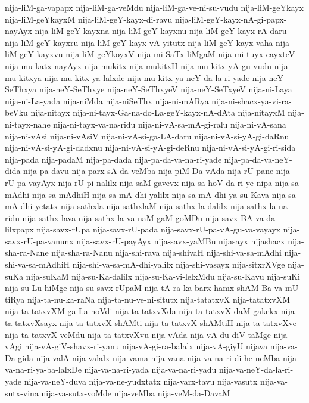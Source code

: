{nija-liM-ga-vapapx
nija-liM-ga-veMdu
nija-liM-ga-ve-ni-su-vudu
nija-liM-geYkayx
nija-liM-geYkayxM
nija-liM-geY-kayx-di-ravu
nija-liM-geY-kayx-nA-gi-papx-nayAyx
nija-liM-geY-kayxna
nija-liM-geY-kayxnu
nija-liM-geY-kayx-rA-daru
nija-liM-geY-kayxru
nija-liM-geY-kayx-vA-yitutx
nija-liM-geY-kayx-vaha
nija-liM-geY-kayxvu
nija-liM-geYkoyxV
nija-mi-SaTx-liMgaM
nija-mi-tuyx-cayxteV
nija-mu-katx-nayAyx
nija-mukitx
nija-mukitxH
nija-mu-kitx-yA-gu-vudu
nija-mu-kitxya
nija-mu-kitx-ya-lalxde
nija-mu-kitx-ya-neY-da-la-ri-yade
nija-neY-SeThxya
nija-neY-SeThxye
nija-neY-SeThxyeV
nija-neY-SeTxyeV
nija-ni-Laya
nija-ni-La-yada
nija-niMda
nija-niSeThx
nija-ni-mARya
nija-ni-shacx-ya-vi-ra-beVku
nija-nitayx
nija-ni-tayx-Ga-na-do-La-geY-kayx-nA-dAta
nija-nitayxM
nija-ni-tayx-nahe
nija-ni-tayx-va-na-ridu
nija-ni-vA-sa-mA-gi-ralu
nija-ni-vA-sana
nija-ni-vAsi
nija-ni-vAsiV
nija-ni-vA-si-ga-LA-daru
nija-ni-vA-si-yA-gi-daRnu
nija-ni-vA-si-yA-gi-dadxnu
nija-ni-vA-si-yA-gi-deRnu
nija-ni-vA-si-yA-gi-ri-sida
nija-pada
nija-padaM
nija-pa-dada
nija-pa-da-va-na-ri-yade
nija-pa-da-va-neY-dida
nija-pa-davu
nija-parx-sA-da-veMba
nija-piM-Da-vAda
nija-rU-pane
nija-rU-pa-vayAyx
nija-rU-pi-nalilx
nija-saM-gavevx
nija-sa-hoV-da-ri-ye-nipa
nija-sa-mAdhi
nija-sa-mAdhiH
nija-sa-mA-dhi-yalilx
nija-sa-mA-dhi-ya-su-Kava
nija-sa-mA-dhi-yetatx
nija-sathxla
nija-sathxlaM
nija-sathx-la-dalilx
nija-sathx-la-na-ridu
nija-sathx-lava
nija-sathx-la-va-naM-gaM-goMDu
nija-savx-BA-va-da-lilxpapx
nija-savx-rUpa
nija-savx-rU-pada
nija-savx-rU-pa-vA-gu-va-vayayx
nija-savx-rU-pa-vanunx
nija-savx-rU-payAyx
nija-savx-yaMBu
nijasayx
nijashacx
nija-sha-ra-Nane
nija-sha-ra-Nanu
nija-shi-rava
nija-shivaH
nija-shi-va-sa-mAdhi
nija-shi-va-sa-mAdhiH
nija-shi-va-sa-mA-dhi-yalilx
nija-shi-vasayx
nija-sitxrXVge
nija-suKa
nija-suKaM
nija-su-Ka-dalilx
nija-su-Ka-vi-lelxMdu
nija-su-Kavu
nija-suKi
nija-su-Lu-hiMge
nija-su-savx-rUpaM
nija-tA-ra-ka-barx-hamx-shAM-Ba-va-mU-tiRya
nija-ta-nu-ka-raNa
nija-ta-nu-ve-ni-situtx
nija-tatatxvX
nija-tatatxvXM
nija-ta-tatxvXM-ga-La-noVdi
nija-ta-tatxvXda
nija-ta-tatxvX-daM-gakekx
nija-ta-tatxvXsayx
nija-ta-tatxvX-shAMti
nija-ta-tatxvX-shAMtiH
nija-ta-tatxvXve
nija-ta-tatxvX-veMdu
nija-ta-tatxvXvu
nija-vAda
nija-vA-du-diV-taMge
nija-vAgi
nija-vA-giV-shavx-ri-yanu
nija-vA-gi-ra-balalx
nija-vA-giyU
nijava
nija-va-Da-gida
nija-valA
nija-valalx
nija-vama
nija-vana
nija-va-na-ri-di-he-neMba
nija-va-na-ri-ya-ba-lalxDe
nija-va-na-ri-yada
nija-va-na-ri-yadu
nija-va-neY-da-la-ri-yade
nija-va-neY-duva
nija-va-ne-yudxtatx
nija-varx-tavu
nija-vasutx
nija-va-sutx-vina
nija-va-sutx-voMde
nija-veMba
nija-veM-da-DavaM
}
